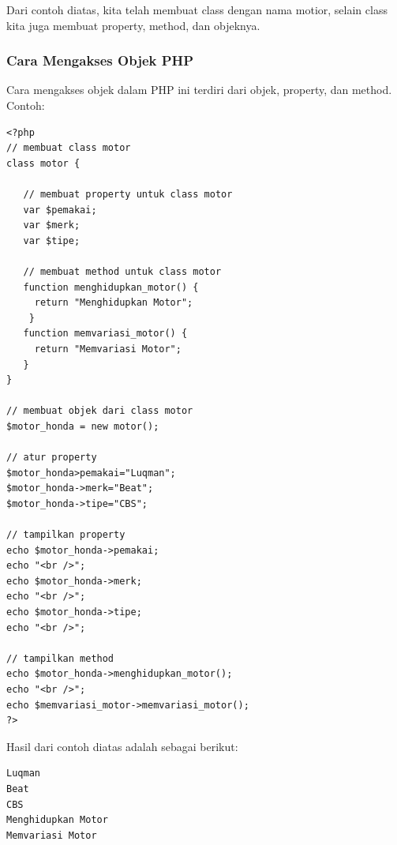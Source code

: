 Dari contoh diatas, kita telah membuat class dengan nama motior, selain class kita juga membuat property, method, dan objeknya. 

\subsubsection{Cara Mengakses Objek PHP}
\newline
Cara mengakses objek dalam PHP ini terdiri dari objek, property, dan method. Contoh:
\begin{lstlisting}
<?php
// membuat class motor
class motor {
  
   // membuat property untuk class motor
   var $pemakai;
   var $merk;
   var $tipe;
  
   // membuat method untuk class motor
   function menghidupkan_motor() {
     return "Menghidupkan Motor";
    }
   function memvariasi_motor() {
     return "Memvariasi Motor";
   }
}
  
// membuat objek dari class motor
$motor_honda = new motor();
  
// atur property
$motor_honda>pemakai="Luqman";
$motor_honda->merk="Beat";
$motor_honda->tipe="CBS";
  
// tampilkan property
echo $motor_honda->pemakai;
echo "<br />";
echo $motor_honda->merk;
echo "<br />";
echo $motor_honda->tipe;
echo "<br />";
  
// tampilkan method
echo $motor_honda->menghidupkan_motor();
echo "<br />";
echo $memvariasi_motor->memvariasi_motor();
?>
\end{lstlisting}

Hasil dari contoh diatas adalah sebagai berikut:
\begin{lstlisting}
Luqman
Beat
CBS
Menghidupkan Motor
Memvariasi Motor
\end{lstlisting}


